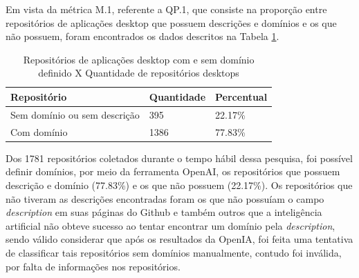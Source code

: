\documentclass[12pt]{article}
\begin{document}
Em vista da métrica M.1, referente a QP.1, que consiste na proporção entre repositórios de aplicações desktop que possuem descrições e domínios e os que não possuem, foram encontrados os dados descritos na Tabela \ref{tab:descricao x sem descricao}{}.
\begin{table}[H]
    \caption{Repositórios de aplicações desktop com e sem domínio definido X Quantidade de repositórios desktops}
    \centering
    \label{tab:descricao x sem descricao}
        \begin{tabular}{|l|l|l|}
        \hline
        Repositório & Quantidade & Percentual\\
        \hline
        Sem domínio ou sem descrição & 395 & 22.17\%\\
        \hline
        Com domínio & 1386 & 77.83\%\\
        \hline
        \end{tabular}
\end{table}
Dos 1781 repositórios coletados durante o tempo hábil dessa pesquisa, foi possível definir domínios, por meio da ferramenta OpenAI, os repositórios que possuem descrição e domínio (77.83\%) e os que não possuem (22.17\%). Os repositórios que não tiveram as descrições encontradas foram os que não possuíam o campo \emph{description} em suas páginas do Github e também outros que a inteligência artificial não obteve sucesso ao tentar encontrar um domínio pela \emph{description}, sendo válido considerar que após os resultados da OpenIA, foi feita uma tentativa de classificar tais repositórios sem domínios manualmente, contudo foi inválida, por falta de informações nos repositórios. 
\end{document}

